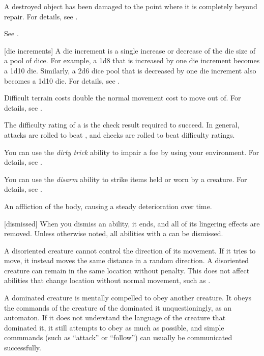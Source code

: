  A destroyed object has been damaged to the point where it is completely beyond repair.
For details, see .

 See .

[die increments] A die increment is a single increase or decrease of the die size of a pool of dice.
For example, a 1d8 that is increased by one die increment becomes a 1d10 die.
Similarly, a 2d6 dice pool that is decreased by one die increment also becomes a 1d10 die.
For details, see .

 Difficult terrain costs double the normal movement cost to move out of.
For details, see .

 The difficulty rating of a  is the check result required to succeed.
In general, attacks are rolled to beat , and checks are rolled to beat difficulty ratings.

 You can use the \textit{dirty trick} ability to impair a foe by using your environment.
For details, see .

 You can use the \textit{disarm} ability to strike items held or worn by a creature.
For details, see .

 An affliction of the body, causing a steady deterioration over time.

[dismissed] When you dismiss an ability, it ends, and all of its lingering effects are removed.
Unless otherwise noted, all abilities with a  can be dismissed.

 A disoriented creature cannot control the direction of its movement.
If it tries to move, it instead moves the same distance in a random direction.
A disoriented creature can remain in the same location without penalty.
This does not affect abilities that change location without normal movement, such as .

 A dominated creature is mentally compelled to obey another creature.
It obeys the commands of the creature of the dominated it unquestioningly, as an automaton.
If it does not understand the language of the creature that dominated it, it still attempts to obey as much as possible, and simple commmands (such as ``attack'' or ``follow'') can usually be communicated successfully.

